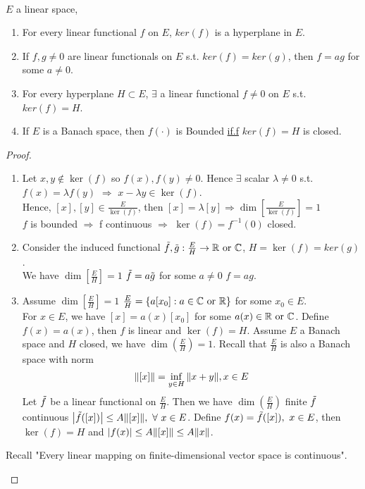 \begin{proposition}\label{4.4}\ \\
$E$ a linear space,
\begin{enumerate}[label = (\alph*)]
    \item For every linear functional $f$ on $E$, $ker(f)$ is a hyperplane in $E$.
    \item  If $f,g\neq 0$ are linear functionals on $E$ s.t. $ker(f) = ker(g)$, then $f = ag$ for some $a \neq 0$. 
    \item For every hyperplane $H \subset E$, $\exists$ a linear functional $f \neq 0$ on $E$ s.t. $ker(f) = H$.
    \item If $E$ is a Banach space, then $f(\cdot)$ is Bounded \underline{if.f} $ker(f) = H$ is closed.
\end{enumerate}
\end{proposition}
\begin{proof}\ 
\begin{enumerate}[label = (\alph*)]
    \item Let $x,y \notin \ker(f)$ so $f(x), f(y) \neq 0$. Hence $\exists$ scalar $\lambda \neq 0$ s.t. $f(x) = \lambda f(y)$ $\Rightarrow$ $x - \lambda y \in \ker(f)$.\\
    Hence, $[x],[y] \in \frac{E}{\ker(f)}$, then $[x] = \lambda[y] \Rightarrow \dim[\frac{E}{\ker(f)}] = 1$\\
    $f$ is bounded $\Rightarrow$ f continuous $\Rightarrow$ $\ker(f) = f^{-1}(0)$ closed. 
    \item Consider the induced functional $\Tilde{f}, \Tilde{g}: \frac{E}{H} \to \mathbb{R}\text{ or } \mathbb{C}$, $H = \ker(f) = ker(g)$.\\ We have $\dim[\frac{E}{H}] = 1$ \imply $\Tilde{f} = a \Tilde{g}$ for some $a \neq 0$ \imply $f = ag$.
    \item Assume $\dim[\frac{E}{H}] = 1$ \imply $\frac{E}{H} = \{a [x_0]: a \in \mathbb{C} \text{ or } \mathbb{R}\}$ for some $x_0 \in E$.\\
    For $x \in E$, we have $[x] = a(x) [x_0]$ for some $a(x) \in \mathbb{R} \text{ or } \mathbb{C}$. Define $f(x) = a(x)$, then $f$ is linear and $\ker(f) = H$. Assume $E$ a Banach space and $H$ closed, we have $\dim(\frac{E}{H}) = 1$. Recall that $\frac{E}{H}$ is also a Banach space with norm
    $$\norm{[x]} = \inf_{y \in H} \norm{x + y}, x\in E $$
    Let $\Tilde{f}$ be a linear functional on $\frac{E}{H}$. Then we have $\dim(\frac{E}{H})$ finite \imply $\Tilde{f}$ continuous \imply $\abs{\Tilde{f}([x])} \leq A \norm{[x]},\ \forall\ x \in E$. Define $f(x) = \Tilde{f}([x]),\ x \in E$, then $\ker(f) = H$ and $\abs{f(x)} \leq A \norm{[x]} \leq A \norm{x}$.
\end{enumerate}
\begin{remark}
Recall "Every linear mapping on finite-dimensional vector space is continuous".
\end{remark}
\end{proof}



